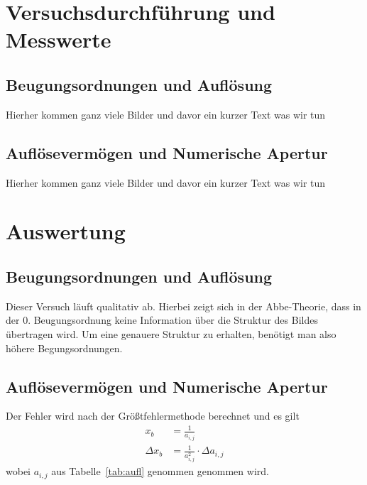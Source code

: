 \documentclass{article}
\begin{document}
\section{Versuchsdurchführung und Messwerte}

\subsection{Beugungsordnungen und Auflösung}


Hierher kommen ganz viele Bilder und davor ein kurzer Text was wir tun

\newpage


\subsection{Auflösevermögen und Numerische Apertur}



Hierher kommen ganz viele Bilder und davor ein kurzer Text was wir tun

\newpage



\section{Auswertung}

\subsection{Beugungsordnungen und Auflösung}

Dieser Versuch läuft qualitativ ab. Hierbei zeigt sich in der Abbe-Theorie, dass in der 0. Beugungsordnung keine Information über die Struktur des Bildes übertragen wird. Um eine genauere Struktur zu erhalten, benötigt man also höhere Begungsordnungen.




\subsection{Auflösevermögen und Numerische Apertur}


Der Fehler wird nach der Größtfehlermethode berechnet und es gilt
\begin{align*}
x_b &= \frac{1}{a_{i,j}} \\
\Delta x_b &= \frac{1}{a_{i,j}^2}\cdot \Delta a_{i,j}
\end{align*}
wobei $a_{i,j}$ aus Tabelle~\ref{tab:aufl} genommen genommen wird. 
\end{document}
